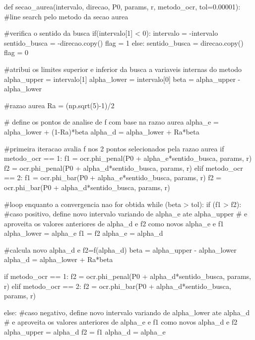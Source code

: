 \documentclass[10pt, a4paper]{article}
\begin{document}
\begin{python}
  def secao_aurea(intervalo, direcao, P0, params, r, metodo_ocr, tol=0.00001):
      #line search pelo metodo da secao aurea
      
      #verifica o sentido da busca
      if(intervalo[1] < 0):
          intervalo = -intervalo
          sentido_busca = -direcao.copy()
          flag = 1
      else:
          sentido_busca = direcao.copy()
          flag = 0
      
      #atribui os limites superior e inferior da busca a variaveis internas do metodo
      alpha_upper = intervalo[1]
      alpha_lower = intervalo[0]
      beta = alpha_upper - alpha_lower
      
      #razao aurea
      Ra = (np.sqrt(5)-1)/2
      
      # define os pontos de analise de f com base na razao aurea
      alpha_e = alpha_lower + (1-Ra)*beta
      alpha_d = alpha_lower + Ra*beta 
      
      #primeira iteracao avalia f nos 2 pontos selecionados pela razao aurea
      if metodo_ocr == 1:
          f1 = ocr.phi_penal(P0 + alpha_e*sentido_busca, params, r)
          f2 = ocr.phi_penal(P0 + alpha_d*sentido_busca, params, r)
      elif metodo_ocr == 2:
          f1 = ocr.phi_bar(P0 + alpha_e*sentido_busca, params, r)
          f2 = ocr.phi_bar(P0 + alpha_d*sentido_busca, params, r)
      
      #loop enquanto a convergencia nao for obtida
      while (beta > tol):
          if (f1 > f2):
              #caso positivo, define novo intervalo variando de alpha_e ate alpha_upper
              # e aproveita os valores anteriores de alpha_d e f2 como novos alpha_e e f1
              alpha_lower = alpha_e
              f1 = f2
              alpha_e = alpha_d
              
              #calcula novo alpha_d e f2=f(alpha_d)
              beta = alpha_upper - alpha_lower
              alpha_d = alpha_lower + Ra*beta
              
              if metodo_ocr == 1:
                  f2 = ocr.phi_penal(P0 + alpha_d*sentido_busca, params, r)
              elif metodo_ocr == 2:
                  f2 = ocr.phi_bar(P0 + alpha_d*sentido_busca, params, r) 
                  
          else:
              #caso negativo, define novo intervalo variando de alpha_lower ate alpha_d
              # e aproveita os valores anteriores de alpha_e e f1 como novos alpha_d e f2
              alpha_upper = alpha_d
              f2 = f1
              alpha_d = alpha_e
              

\end{python}
\end{document}
